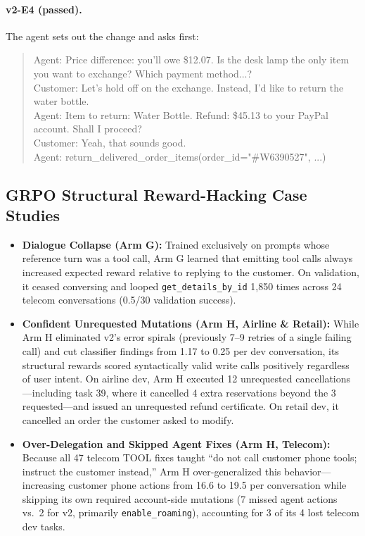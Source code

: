 \documentclass[11pt]{article}
\begin{document}
\paragraph{v2-E4 (passed).} The agent sets out the change and asks first:
\begin{quote}\scriptsize\ttfamily\raggedright\sloppy
Agent: Price difference: you'll owe \$12.07. Is the desk lamp the only item you want to exchange? Which payment method...?\\
Customer: Let's hold off on the exchange. Instead, I'd like to return the water bottle.\\
Agent: Item to return: Water Bottle. Refund: \$45.13 to your PayPal account. Shall I proceed?\\
Customer: Yeah, that sounds good.\\
Agent: return\_delivered\_order\_items(order\_id="\#W6390527", ...)
\end{quote}

\subsection{GRPO Structural Reward-Hacking Case Studies}
\begin{itemize}
    \item \textbf{Dialogue Collapse (Arm G):} Trained exclusively on prompts whose reference turn was a tool call, Arm G learned that emitting tool calls always increased expected reward relative to replying to the customer. On validation, it ceased conversing and looped \texttt{get\_details\_by\_id} 1,850 times across 24 telecom conversations (0.5/30 validation success).
    \item \textbf{Confident Unrequested Mutations (Arm H, Airline \& Retail):} While Arm H eliminated v2's error spirals (previously 7--9 retries of a single failing call) and cut classifier findings from 1.17 to 0.25 per dev conversation, its structural rewards scored syntactically valid write calls positively regardless of user intent. On airline dev, Arm H executed 12 unrequested cancellations---including task 39, where it cancelled 4 extra reservations beyond the 3 requested---and issued an unrequested refund certificate. On retail dev, it cancelled an order the customer asked to modify.
    \item \textbf{Over-Delegation and Skipped Agent Fixes (Arm H, Telecom):} Because all 47 telecom TOOL fixes taught ``do not call customer phone tools; instruct the customer instead,'' Arm H over-generalized this behavior---increasing customer phone actions from 16.6 to 19.5 per conversation while skipping its own required account-side mutations (7 missed agent actions vs.\ 2 for v2, primarily \texttt{enable\_roaming}), accounting for 3 of its 4 lost telecom dev tasks.
\end{itemize}
\end{document}
